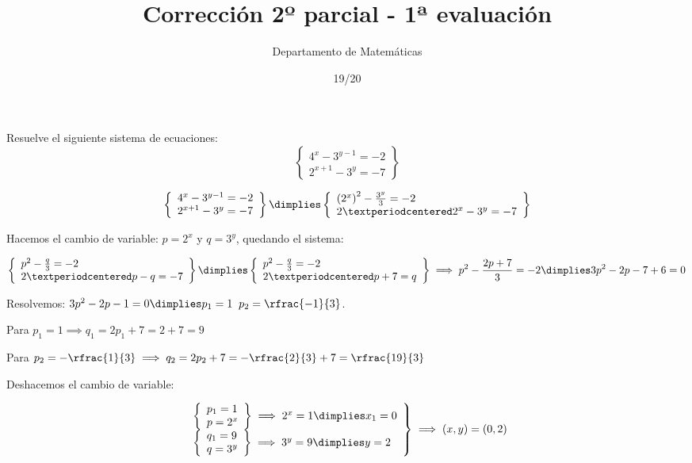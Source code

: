 \documentclass[palatino,nosec,nochap,nobuilddate]{Docencia}
\title{Corrección 2º parcial - 1ª evaluación}
\author{Departamento de Matemáticas}
\date{19/20}
\newcommand\BackgroundPic{%
\put(0,0){%
\parbox[b][\paperheight]{\paperwidth}{%
\vfill
\centering
\vfill
}}}
\begin{document}
\pagestyle{plain}
\maketitle

\AddToShipoutPicture{\BackgroundPic}

\newpage
\begin{problem}
Resuelve el siguiente sistema de ecuaciones:
\[
	\left\{
		\begin{array}{l}
			4^x-3^{y-1}=-2\\
			2^{x+1}-3^y=-7
		\end{array}
	\right\}
\]
\solution

\[
	\left\{
		\begin{array}{l}
			4^x-3^{y-1}=-2\\
			2^{x+1}-3^y=-7
		\end{array}
	\right\} \dimplies 
	\left\{
		\begin{array}{l}
			\left(2^x\right)^2-\frac{3^{y}}{3}=-2\\
			2·2^x-3^y=-7
		\end{array}
	\right\} 
\]

Hacemos el cambio de variable: $p=2^x$ y $q=3^y$, quedando el sistema:


\[
	\left\{
		\begin{array}{l}
			p^2-\frac{q}{3}=-2\\
			2·p-q=-7
		\end{array}
	\right\} \dimplies 
	\left\{
		\begin{array}{l}
			p^2-\frac{q}{3}=-2\\
			2·p+7=q
		\end{array}
	\right\} \implies
	p^2-\frac{2p+7}{3}=-2 \dimplies 3p^2-2p-7+6=0 
\]

Resolvemos: $3p^2-2p-1=0 \dimplies p_1 = 1 \;\; p_2 = \rfrac{-1}{3}$. 

Para $p_1 = 1 \implies q_1 = 2p_1+7 = 2+7 = 9$

Para $p_2 = -\rfrac{1}{3} \implies q_2 = 2p_2+7 = -\rfrac{2}{3}+7 = \rfrac{19}{3}$

Deshacemos el cambio de variable:

\[
	\left.
	\begin{array}{l}
		\left\{
			\begin{array}{l}
				p_1 = 1\\
				p = 2^x
			\end{array}
		\right\} \implies 2^x = 1 \dimplies x_1 = 0\\
		\left\{
			\begin{array}{l}
				q_1 = 9\\
				q = 3^y
			\end{array}
		\right\} \implies 3^y = 9 \dimplies y = 2 
	\end{array}\right\} \implies (x,y) = (0,2)
\]


\end{problem}
\end{document}
